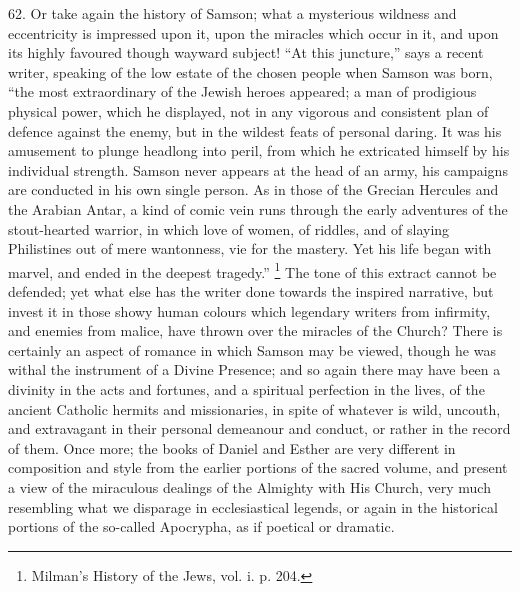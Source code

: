 62.
Or take again the history of Samson; what a mysterious wildness and
eccentricity is impressed upon it, upon the miracles which occur in
it, and upon its highly favoured though wayward subject! ``At this
juncture,'' says a recent writer, speaking of the low estate of the
chosen people when Samson was born, ``the most extraordinary of the
Jewish heroes appeared; a man of prodigious physical power, which
he displayed, not in any vigorous and consistent plan of defence
against the enemy, but in the wildest feats of personal daring. It was
his amusement to plunge headlong into peril, from which he extricated
himself by his individual strength. Samson never appears at the head
of an army, his campaigns are conducted in his own single person. As
in those of the Grecian Hercules and the Arabian Antar, a kind of
comic vein runs through the early adventures of the stout-hearted
warrior, in which love of women, of riddles, and of slaying
Philistines out of mere wantonness, vie for the mastery. Yet his life
began with marvel, and ended in the deepest tragedy.'' \footnote{Milman's History of the Jews, vol. i. p. 204.} The
tone of this extract cannot be defended; yet what else has the writer
done towards the inspired narrative, but invest it in those showy
human colours which legendary writers from infirmity, and enemies from
malice, have thrown over the miracles of the Church? There is
certainly an aspect of romance in which Samson may be viewed, though
he was withal the instrument of a Divine Presence; and so again there
may have been a divinity in the acts and fortunes, and a spiritual
perfection in the lives, of the ancient Catholic hermits and
missionaries, in spite of whatever is wild, uncouth, and extravagant
in their personal demeanour and conduct, or rather in the record of
them. Once more; the books of Daniel and Esther are very different in
composition and style from the earlier portions of the sacred
volume, and present a view of the miraculous dealings of the Almighty
with His Church, very much resembling what we disparage in
ecclesiastical legends, or again in the historical portions of the
so-called Apocrypha, as if poetical or dramatic.

